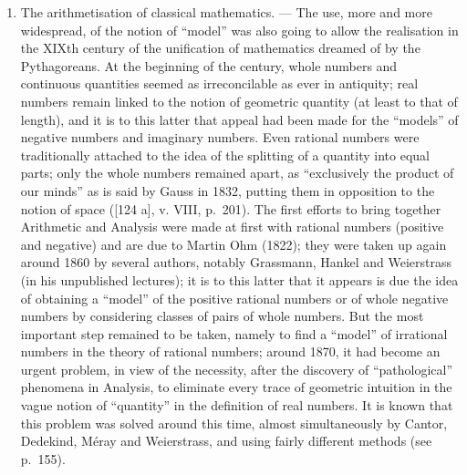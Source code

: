 \begin{enumerate}
notion of isomorphic groups for abelian groups is known to Gauss, for groups of permutations to Galois (cf.~pp.~51 ff.); it is acquired in a general way for any group whatsoever around the middle of the XIXth century. \(^{35}\) Following this, with each new axiomatic theory, it is a natural development to define a notion of isomorphism; but it is only with the modern notion of structure that it was finally recognised that every structure carries within itself a notion of isomorphism, and that it is not necessary to give a special definition of it for each type of structure.
\item
  The arithmetisation of classical mathematics. --- The use, more and more widespread, of the notion of ``model'' was also going to allow the realisation in the XIXth century of the unification of mathematics dreamed of by the Pythagoreans. At the beginning of the century, whole numbers and continuous quantities seemed as irreconcilable as ever in antiquity; real numbers remain linked to the notion of geometric quantity (at least to that of length), and it is to this latter that appeal had been made for the ``models'' of negative numbers and imaginary numbers. Even rational numbers were traditionally attached to the idea of the splitting of a quantity into equal parts; only the whole numbers remained apart, as ``exclusively the product of our minds'' as is said by Gauss in 1832, putting them in opposition to the notion of space ({[}124 a{]}, v. VIII, p.~201). The first efforts to bring together Arithmetic and Analysis were made at first with rational numbers (positive and negative) and are due to Martin Ohm (1822); they were taken up again around 1860 by several authors, notably Grassmann, Hankel and Weierstrass (in his unpublished lectures); it is to this latter that it appears is due the idea of obtaining a ``model'' of the positive rational numbers or of whole negative numbers by considering classes of pairs of whole numbers. But the most important step remained to be taken, namely to find a ``model'' of irrational numbers in the theory of rational numbers; around 1870, it had become an urgent problem, in view of the necessity, after the discovery of ``pathological'' phenomena in Analysis, to eliminate every trace of geometric intuition in the vague notion of ``quantity'' in the definition of real numbers. It is known that this problem was solved around this time, almost simultaneously by Cantor, Dedekind, Méray and Weierstrass, and using fairly different methods (see p.~155).
\end{enumerate}

